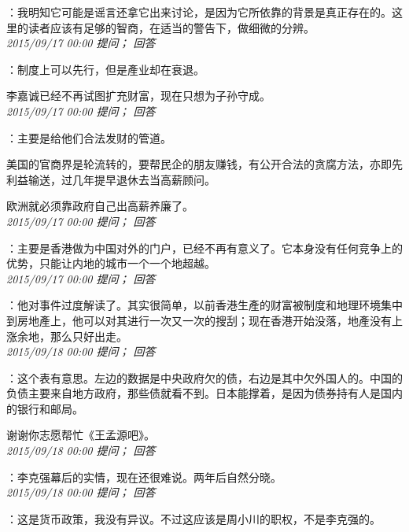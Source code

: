 \documentclass[twocolumn]{ctexart}
\begin{document}
：我明知它可能是谣言还拿它出来讨论，是因为它所依靠的背景是真正存在的。这里的读者应该有足够的智商，在适当的警告下，做细微的分辨。\\

\textit{\hfill\noindent\small 2015/09/17 00:00 提问； 回答}

：制度上可以先行，但是產业却在衰退。

李嘉诚已经不再试图扩充财富，现在只想为子孙守成。\\

\textit{\hfill\noindent\small 2015/09/17 00:00 提问； 回答}

：主要是给他们合法发财的管道。

美国的官商界是轮流转的，要帮民企的朋友赚钱，有公开合法的贪腐方法，亦即先利益输送，过几年提早退休去当高薪顾问。

欧洲就必须靠政府自己出高薪养廉了。\\

\textit{\hfill\noindent\small 2015/09/17 00:00 提问； 回答}

：主要是香港做为中国对外的门户，已经不再有意义了。它本身没有任何竞争上的优势，只能让内地的城市一个一个地超越。\\

\textit{\hfill\noindent\small 2015/09/17 00:00 提问； 回答}

：他对事件过度解读了。其实很简单，以前香港生產的财富被制度和地理环境集中到房地產上，他可以对其进行一次又一次的搜刮；现在香港开始没落，地產没有上涨余地，那么只好出走。\\

\textit{\hfill\noindent\small 2015/09/18 00:00 提问； 回答}

：这个表有意思。左边的数据是中央政府欠的债，右边是其中欠外国人的。中国的负债主要来自地方政府，那些债就看不到。日本能撑着，是因为债券持有人是国内的银行和邮局。

谢谢你志愿帮忙《王孟源吧》。\\

\textit{\hfill\noindent\small 2015/09/18 00:00 提问； 回答}

：李克强幕后的实情，现在还很难说。两年后自然分晓。\\

\textit{\hfill\noindent\small 2015/09/18 00:00 提问； 回答}

：这是货币政策，我没有异议。不过这应该是周小川的职权，不是李克强的。\\
\end{document}

